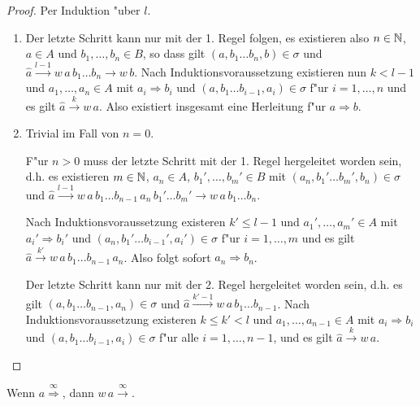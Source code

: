 \documentclass[12pt,a4paper]{article}
\begin{document}
\begin{proof}
  Per Induktion "uber $l$.
  \begin{enumerate}
  \item Der letzte Schritt kann nur mit der 1. Regel folgen, es existieren also $n\in\mathbb N$, $a \in A$
    und $b_1,\ldots,b_n \in B$, so dass gilt $(a,b_1 \ldots b_n,b) \in \sigma$ und
    $\hat{a} \stackrel{l-1}{\to} w\,a\,b_1 \ldots b_n \to w\,b$. Nach Induktionsvoraussetzung existieren
    nun $k < l-1$ und $a_1,\ldots,a_n \in A$ mit $a_i \Rightarrow b_i$ und $(a,b_1 \ldots b_{i-1},a_i)\in\sigma$
    f"ur $i=1,\ldots,n$ und es gilt $\hat{a} \stackrel{k}{\to} w\,a$. Also existiert insgesamt eine
    Herleitung f"ur $a \Rightarrow b$.
  \item Trivial im Fall von $n = 0$.

    F"ur $n > 0$ muss der letzte Schritt mit der 1. Regel hergeleitet worden sein, d.h. es existieren
    $m \in \mathbb N$, $a_n \in A$, $b_1',\ldots,b_m' \in B$ mit $(a_n,b_1' \ldots b_m',b_n) \in \sigma$ und
    $\hat{a} \stackrel{l-1}{\to} w\,a\,b_1 \ldots b_{n-1}\,a_n\,b_1'\ldots b_m' \to w\,a\,b_1 \ldots b_n$.

    Nach Induktionsvoraussetzung existeren $k' \le l-1$ und $a_1',\ldots,a_m' \in A$ mit
    $a_i' \Rightarrow b_i'$ und $(a_n,b_1' \ldots b_{i-1}',a_i') \in \sigma$ f"ur $i=1,\ldots,m$
    und es gilt $\hat{a} \stackrel{k'}{\to} w\,a\,b_1 \ldots b_{n-1}\,a_n$. Also folgt sofort
    $a_n \Rightarrow b_n$.

    Der letzte Schritt kann nur mit der 2. Regel hergeleitet worden sein, d.h. es gilt
    $(a,b_1 \ldots b_{n-1},a_n) \in \sigma$ und $\hat{a} \stackrel{k'-1}{\to} w\,a\,b_1 \ldots b_{n-1}$.
    Nach Induktionsvoraussetzung existeren $k \le k' < l$ und $a_1,\ldots,a_{n-1} \in A$ mit
    $a_i \Rightarrow b_i$ und $(a,b_1 \ldots b_{i-1},a_i) \in \sigma$ f"ur alle $i=1,\ldots,n-1$, und
    es gilt $\hat{a} \stackrel{k}{\to} w\,a$.
  \end{enumerate}
\end{proof}

\begin{theorem}
  Wenn $a \stackrel{\infty}{\Rightarrow}$, dann $w\,a \stackrel{\infty}{\rightarrow}$.
\end{theorem}
\end{document}
